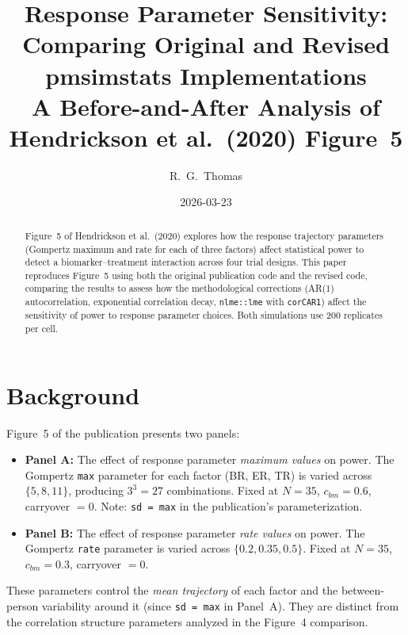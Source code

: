 \documentclass[11pt]{article}
\title{Response Parameter Sensitivity:\\
       Comparing Original and Revised\\
       pmsimstats Implementations\\[6pt]
       \large A Before-and-After Analysis of\\
       Hendrickson et al.\ (2020) Figure~5}
\author{R.\ G.\ Thomas}
\date{2026-03-23}
\begin{document}
\maketitle
\thispagestyle{fancy}

\begin{abstract}
Figure~5 of Hendrickson et al.\ (2020) explores how the
response trajectory parameters (Gompertz maximum and rate
for each of three factors) affect statistical power to
detect a biomarker--treatment interaction across four trial
designs. This paper reproduces Figure~5 using both the
original publication code and the revised code, comparing
the results to assess how the methodological corrections
(AR(1) autocorrelation, exponential correlation decay,
\texttt{nlme::lme} with \texttt{corCAR1}) affect the
sensitivity of power to response parameter choices. Both
simulations use 200 replicates per cell.
\end{abstract}

\tableofcontents
\newpage

\section{Background}

Figure~5 of the publication presents two panels:

\begin{itemize}
\item \textbf{Panel A:} The effect of response parameter
  \emph{maximum values} on power. The Gompertz \texttt{max}
  parameter for each factor (BR, ER, TR) is varied across
  $\{5, 8, 11\}$, producing $3^3 = 27$ combinations.
  Fixed at $N = 35$, $c_{bm} = 0.6$, carryover $= 0$.
  Note: \texttt{sd = max} in the publication's
  parameterization.

\item \textbf{Panel B:} The effect of response parameter
  \emph{rate values} on power. The Gompertz \texttt{rate}
  parameter is varied across $\{0.2, 0.35, 0.5\}$.
  Fixed at $N = 35$, $c_{bm} = 0.3$, carryover $= 0$.
\end{itemize}

These parameters control the \emph{mean trajectory} of
each factor and the between-person variability around it
(since \texttt{sd = max} in Panel~A). They are distinct
from the correlation structure parameters analyzed in the
Figure~4 comparison.
\end{document}
